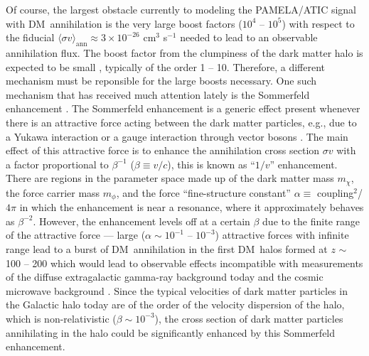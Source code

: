\documentclass[aps,prd,twocolumn,amsmath,amssymb,floatfix,nofootinbib,10pt]{revtex4}
\newcommand{\eg}{e.g.}
\newcommand{\DM}{DM}
\newcommand{\mdm}{\ensuremath{m_{\chi}}}
\newcommand{\mv}{\ensuremath{m_{\phi}}}
\begin{document}
Of course, the largest obstacle currently to modeling the PAMELA/ATIC
signal with \DM\ annihilation is the very large boost factors ($10^4$
-- $10^5$) with respect to the fiducial $\langle \sigma v
\rangle_{\mathrm{ann}} \approx 3 \times 10^{-26} $ cm$^3$ s$^{-1}$
needed to lead to an observable annihilation flux. The boost factor
from the clumpiness of the dark matter halo is expected to be small
\cite{2008A&A...479..427L,2008Natur.454..735D,2008ApJ...686..262K,2008Natur.456...73S},
typically of the order 1 -- 10. Therefore, a different mechanism must
be reponsible for the large boosts necessary. One such mechanism that
has received much attention lately is the Sommerfeld enhancement
\cite{sommerfeld31a,2003PhRvD..67g5014H,2004PhRvL..92c1303H,2005PhRvD..71f3528H,2005PhRvD..71a5007H,2006PhRvD..73e5004H,2008NuPhB.800..204C,2008JHEP...07..058M,2008arXiv0812.0559M,2008arXiv0812.0360L}. The
Sommerfeld enhancement is a generic effect present whenever there is
an attractive force acting between the dark matter particles, \eg, due
to a Yukawa interaction or a gauge interaction through vector bosons
\cite{ArkaniHamed:2008qn}. The main effect of this attractive force is
to enhance the annihilation cross section $\sigma v$ with a factor
proportional to $\beta^{-1}$ ($\beta \equiv v/c$), this is known as
``$1/v$'' enhancement. There are regions in the parameter space made
up of the dark matter mass \mdm, the force carrier mass \mv, and the
force ``fine-structure constant'' $\alpha \equiv$ coupling$^2$/$4 \pi$
in which the enhancement is near a resonance, where it approximately
behaves as $\beta^{-2}$. However, the enhancement levels off at a
certain $\beta$ due to the finite range of the attractive force ---
large ($\alpha \sim\!10^{-1}$ -- $10^{-3}$) attractive forces with
infinite range lead to a burst of \DM\ annihilation in the first \DM\
halos formed at $z$ $\sim$ 100 -- 200 which would lead to observable
effects incompatible with measurements of the diffuse extragalactic
gamma-ray background today and the cosmic microwave background
\cite{2008arXiv0810.3233K}. Since the typical velocities of dark
matter particles in the Galactic halo today are of the order of the
velocity dispersion of the halo, which is non-relativistic ($\beta\sim
10^{-3}$), the cross section of dark matter particles annihilating in
the halo could be significantly enhanced by this Sommerfeld
enhancement.
\end{document}
